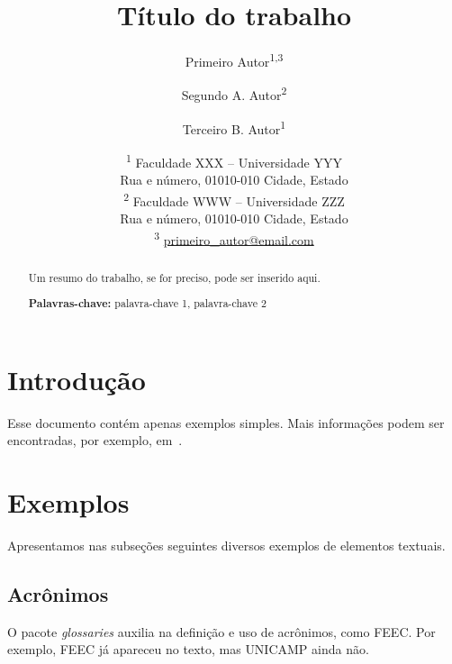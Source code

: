 \documentclass[a4paper,11pt]{article}
\begin{document}
\title{Título do trabalho}

\author{Primeiro Autor\textsuperscript{1,3}
\and Segundo A. Autor\textsuperscript{2}
\and Terceiro B. Autor\textsuperscript{1}}

\date{%
\textsuperscript{1} Faculdade XXX -- Universidade YYY\\
Rua e número, 01010-010 Cidade, Estado\\[1.6ex]
\textsuperscript{2} Faculdade WWW -- Universidade ZZZ\\
Rua e número, 01010-010 Cidade, Estado\\[1.6ex]
\textsuperscript{3} \href{mailto:primeiro_autor@email.com}{primeiro\_autor@email.com}}

\maketitle


\begin{abstract}

Um resumo do trabalho, se for preciso, pode ser inserido aqui.

{\bf\footnotesize Palavras-chave:} palavra-chave 1, palavra-chave 2

\end{abstract}


\tableofcontents


\section{Introdução}
\label{sec:intro}

Esse documento contém apenas exemplos simples.
Mais informações podem ser encontradas, por exemplo, em~\cite{oetiker_not_2015,latex_wikibook}.


\section{Exemplos}

Apresentamos nas subseções seguintes diversos exemplos de elementos textuais.


\subsection{Acrônimos}

O pacote \emph{glossaries} auxilia na definição e uso de acrônimos, como \gls{FEEC}.
Por exemplo, \gls{FEEC} já apareceu no texto, mas \gls{UNICAMP} ainda não.
\end{document}
